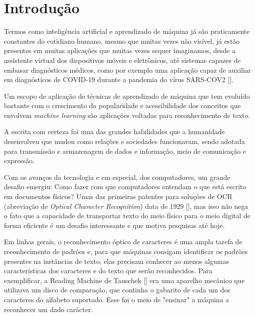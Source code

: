 
\chapter[Introdução]{Introdução}

Termos como inteligência artificial e aprendizado de máquina já são praticamente constantes do cotidiano humano, mesmo que muitas vezes não visível, já estão presentes em muitas aplicações que muitas vezes sequer imaginamos, desde a assistente virtual dos dispositivos móveis e eletrônicos, até sistemas capazes de embasar diagnósticos médicos, como por exemplo uma aplicação capaz de auxiliar em diagnósticos de COVID-19 durante a pandemia do vírus SARS-COV2 []. 

Um escopo de aplicação de técnicas de aprendizado de máquina que tem evoluído bastante com o crescimento da popularidade e acessibilidade dos conceitos que envolvem \textit{machine learning} são aplicações voltadas para reconhecimento de texto.

A escrita com certeza foi uma das grandes habilidades que a humanidade desenvolveu que mudou como relações e sociedades funcionavam, sendo adotada para transmissão e armazenagem de dados e informação, meio de comunicação e expressão.

Com os avanços da tecnologia e em especial, dos computadores, um grande desafio emergiu: Como fazer com que computadores entendam o que está escrito em documentos físicos? Umas das primeiras patentes para soluções de OCR (abreviação de \textit{Optical Character Recognition}) data de 1929 [], mas isso não nega o fato que a capacidade de transportar texto do meio físico para o meio digital de forma eficiente é um desafio interessante e que motiva pesquisas até hoje.

Em linhas gerais, o reconhecimento óptico de caracteres é uma ampla tarefa de reconhecimento de padrões e, para que máquinas consigam identificar os padrões presentes na instâncias de texto, elas precisam conhecer ao menos algumas características dos caracteres e do texto que serão reconhecidos. Para exemplificar, a Reading Machine de Tauschek [] era uma aparelho mecânico que utilizava um disco de comparação, que continha o gabarito de cada um dos caracteres do alfabeto suportado. Esse foi o meio de "ensinar" a máquina a reconhecer um dado carácter.

